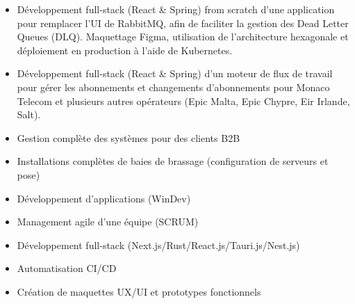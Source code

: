 \documentclass[10pt,a4paper,ragged2e,withhyper]{altacv}
\begin{document}

\makecvheader


\begin{paracol}{2}


\begin{itemize}
    \item Développement full-stack (React \& Spring) from scratch d'une application pour remplacer l'UI de RabbitMQ, afin de faciliter la gestion des Dead Letter Queues (DLQ). Maquettage Figma, utilisation de l'architecture hexagonale et déploiement en production à l'aide de Kubernetes.
    \item Développement  full-stack (React \& Spring) d'un moteur de flux de travail pour gérer les abonnements et changements d’abonnements pour Monaco Telecom et plusieurs autres opérateurs (Epic Malta, Epic Chypre, Eir Irlande, Salt).
\end{itemize}

\divider

\begin{itemize}
    \item Gestion complète des systèmes pour des clients B2B
    \item Installations complètes de baies de brassage (configuration de serveurs et pose)
    \item Développement d'applications (WinDev)
\end{itemize}


\begin{itemize}
    \item Management agile d'une équipe (SCRUM)
    \item Développement full-stack (Next.js/Rust/React.js/Tauri.js/Nest.js)
    \item Automatisation CI/CD
    \item Création de maquettes UX/UI et prototypes fonctionnels
\end{itemize}


\end{paracol}
\end{document}
